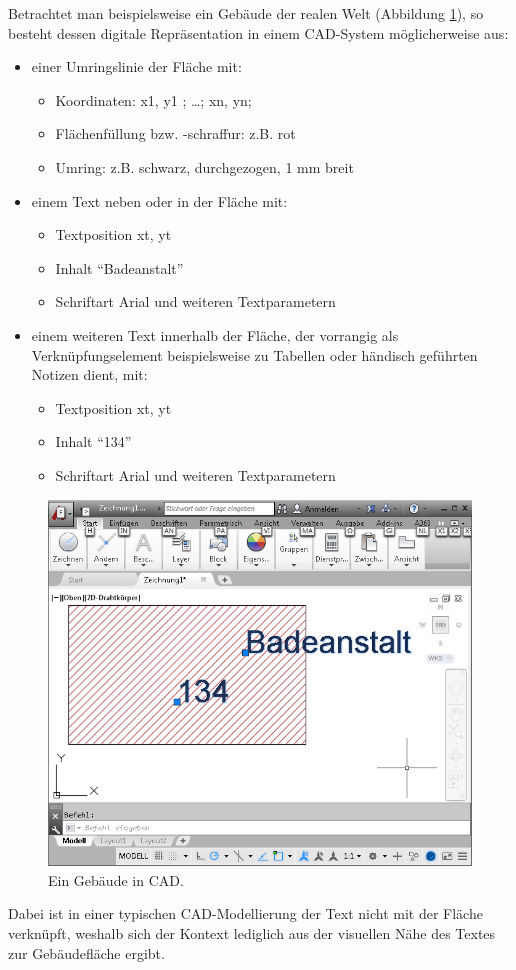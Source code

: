 Betrachtet man beispielsweise ein Gebäude der realen Welt (Abbildung \ref{abb:vektor_CAD-Gebaeude}), so besteht dessen digitale Repräsentation in einem CAD-System möglicherweise aus:
\begin{itemize}
	\item einer Umringslinie der Fläche mit:
	\begin{itemize}
		\item Koordinaten: x1, y1 ; \dots ; xn, yn;
		\item Flächenfüllung bzw. -schraffur: z.B. rot
		\item Umring: z.B. schwarz, durchgezogen, 1 mm breit
	\end{itemize}
	\item einem Text neben oder in der Fläche mit:
	\begin{itemize}
		\item Textposition xt, yt
		\item Inhalt "`Badeanstalt"'
		\item Schriftart Arial und weiteren Textparametern
	\end{itemize}
	\item einem weiteren Text innerhalb der Fläche, der vorrangig als Verknüpfungselement beispielsweise zu Tabellen oder händisch geführten Notizen dient, mit:
	\begin{itemize}
		\item Textposition xt, yt
		\item Inhalt "`134"'
		\item Schriftart Arial und weiteren Textparametern
	\end{itemize}
\end{itemize}

\begin{figure}
\centering
  \includegraphics[width=\linewidth]{bilder/vektor_CAD-Gebaeude.png}
  \caption{Ein Gebäude in CAD.}
	\label{abb:vektor_CAD-Gebaeude}
\end{figure}
Dabei ist in einer typischen CAD-Modellierung der Text nicht mit der Fläche verknüpft, weshalb sich der Kontext lediglich aus der visuellen Nähe des Textes zur Gebäudefläche ergibt.

